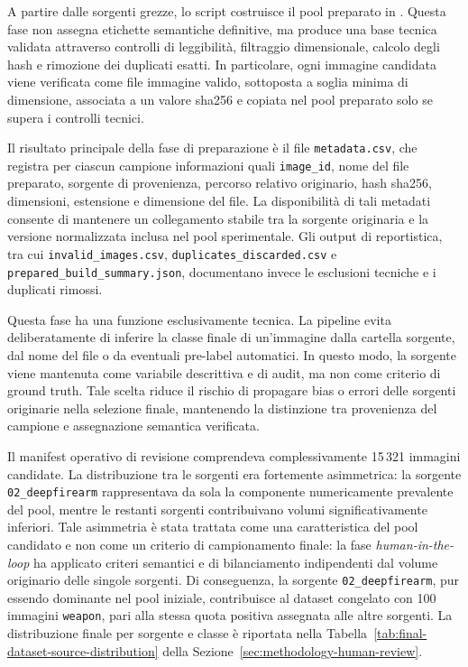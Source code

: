 A partire dalle sorgenti grezze, lo script
 costruisce
il pool preparato in . Questa fase non
assegna etichette semantiche definitive, ma produce una base tecnica validata
attraverso controlli di leggibilità, filtraggio dimensionale, calcolo degli hash
e rimozione dei duplicati esatti. In particolare, ogni immagine candidata viene
verificata come file immagine valido, sottoposta a soglia minima di dimensione,
associata a un valore \gls{sha256} e copiata nel pool preparato solo se supera i
controlli tecnici.

Il risultato principale della fase di preparazione è il file
\texttt{metadata.csv}, che registra per ciascun campione informazioni quali
\texttt{image\_id}, nome del file preparato, sorgente di provenienza, percorso
relativo originario, hash \gls{sha256}, dimensioni, estensione e dimensione del file.
La disponibilità di tali metadati consente di mantenere un collegamento stabile
tra la sorgente originaria e la versione normalizzata inclusa nel pool
sperimentale. Gli output di reportistica, tra cui \texttt{invalid\_images.csv},
\texttt{duplicates\_discarded.csv} e \texttt{prepared\_build\_summary.json},
documentano invece le esclusioni tecniche e i duplicati rimossi.

Questa fase ha una funzione esclusivamente tecnica. La pipeline evita
deliberatamente di inferire la classe finale di un'immagine dalla cartella
sorgente, dal nome del file o da eventuali pre-label automatici. In questo modo,
la sorgente viene mantenuta come variabile descrittiva e di  audit, ma non come criterio di ground truth.
Tale scelta riduce il rischio di propagare bias o errori delle sorgenti originarie nella
selezione finale, mantenendo la distinzione tra provenienza del campione e
assegnazione semantica verificata.

Il manifest operativo di revisione comprendeva complessivamente 15\,321 immagini
candidate. La distribuzione tra le sorgenti era fortemente asimmetrica: la
sorgente \texttt{02\_deepfirearm} rappresentava da sola la componente
numericamente prevalente del pool, mentre le restanti sorgenti contribuivano
volumi significativamente inferiori. Tale asimmetria è stata trattata come una
caratteristica del pool candidato e non come un criterio di campionamento
finale: la fase \textit{human-in-the-loop} ha applicato criteri semantici e di
bilanciamento indipendenti dal volume originario delle singole sorgenti.
Di conseguenza, la sorgente \texttt{02\_deepfirearm}, pur essendo dominante nel
pool iniziale, contribuisce al dataset congelato con 100 immagini
\texttt{weapon}, pari alla stessa quota positiva assegnata alle altre sorgenti.
La distribuzione finale per sorgente e classe è riportata nella
Tabella~\ref{tab:final-dataset-source-distribution} della
Sezione~\ref{sec:methodology-human-review}.

